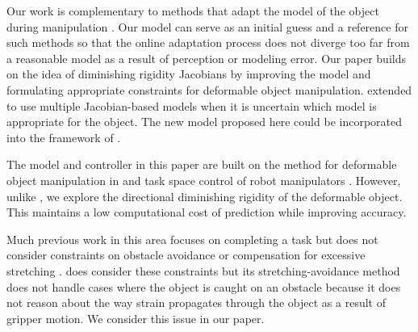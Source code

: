 Our work is complementary to methods that adapt the model of the object during manipulation \cite{Navarro-Alarcon2014, NavarroAlarcon2018, Hu2018deformable_gpr}. Our model can serve as an initial guess and a reference for such methods so that the online adaptation process does not diverge too far from a reasonable model as a result of perception or modeling error. 
Our paper builds on the idea of diminishing rigidity Jacobians \cite{Berenson2013} by improving the model and formulating appropriate constraints for deformable object manipulation. \cite{McConachie2018} extended \cite{Berenson2013} to use multiple Jacobian-based models when it is uncertain which model is appropriate for the object. The new model proposed here could be incorporated into the framework of \cite{McConachie2018}. 


The model and controller in this paper are built on the method for deformable object manipulation in \cite{Berenson2013} and task space control of robot manipulators \cite{Khatib1987}.
However, unlike \cite{Berenson2013}, we explore the directional diminishing rigidity of the deformable object. This maintains a low computational cost of prediction while improving accuracy.

Much previous work in this area focuses on completing a task but does not consider constraints on obstacle avoidance or compensation for excessive stretching \cite{Hirai2000, Wada2001}. \cite{Berenson2013} does consider these constraints but its stretching-avoidance method does not handle cases where the object is caught on an obstacle because it does not reason about the way strain propagates through the object as a result of gripper motion. We consider this issue in our paper.

